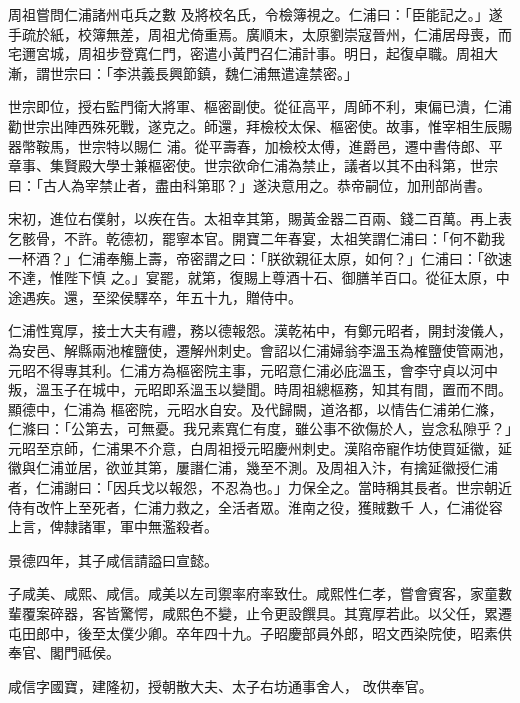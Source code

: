 \begin{pinyinscope}
 周祖嘗問仁浦諸州屯兵之數
 及將校名氏，令檢簿視之。仁浦曰：「臣能記之。」遂手疏於紙，校簿無差，周祖尤倚重焉。廣順末，太原劉崇寇晉州，仁浦居母喪，而宅邇宮城，周祖步登寬仁門，密遣小黃門召仁浦計事。明日，起復卓職。周祖大漸，謂世宗曰：「李洪義長興節鎮，魏仁浦無遣違禁密。」



 世宗即位，授右監門衛大將軍、樞密副使。從征高平，周師不利，東偏已潰，仁浦勸世宗出陣西殊死戰，遂克之。師還，拜檢校太保、樞密使。故事，惟宰相生辰賜器幣鞍馬，世宗特以賜仁
 浦。從平壽春，加檢校太傅，進爵邑，遷中書侍郎、平章事、集賢殿大學士兼樞密使。世宗欲命仁浦為禁止，議者以其不由科第，世宗曰：「古人為宰禁止者，盡由科第耶？」遂決意用之。恭帝嗣位，加刑部尚書。



 宋初，進位右僕射，以疾在告。太祖幸其第，賜黃金器二百兩、錢二百萬。再上表乞骸骨，不許。乾德初，罷寧本官。開寶二年春宴，太祖笑謂仁浦曰：「何不勸我一杯酒？」仁浦奉觴上壽，帝密謂之曰：「朕欲親征太原，如何？」仁浦曰：「欲速不達，惟陛下慎
 之。」宴罷，就第，復賜上尊酒十石、御膳羊百口。從征太原，中途遇疾。還，至梁侯驛卒，年五十九，贈侍中。



 仁浦性寬厚，接士大夫有禮，務以德報怨。漢乾祐中，有鄭元昭者，開封浚儀人，為安邑、解縣兩池榷鹽使，遷解州刺史。會詔以仁浦婦翁李溫玉為榷鹽使管兩池，元昭不得專其利。仁浦方為樞密院主事，元昭意仁浦必庇溫玉，會李守貞以河中叛，溫玉子在城中，元昭即系溫玉以變聞。時周祖總樞務，知其有間，置而不問。顯德中，仁浦為
 樞密院，元昭水自安。及代歸闕，道洛都，以情告仁浦弟仁滌，仁滌曰：「公第去，可無憂。我兄素寬仁有度，雖公事不欲傷於人，豈念私隙乎？」元昭至京師，仁浦果不介意，白周祖授元昭慶州刺史。漢陷帝寵作坊使買延徽，延徽與仁浦並居，欲並其第，屢譖仁浦，幾至不測。及周祖入汴，有擒延徽授仁浦者，仁浦謝曰：「因兵戈以報怨，不忍為也。」力保全之。當時稱其長者。世宗朝近侍有改忤上至死者，仁浦力救之，全活者眾。淮南之役，獲賊數千
 人，仁浦從容上言，俾隸諸軍，軍中無濫殺者。



 景德四年，其子咸信請謚曰宣懿。



 子咸美、咸熙、咸信。咸美以左司禦率府率致仕。咸熙性仁孝，嘗會賓客，家童數輩覆案碎器，客皆驚愕，咸熙色不變，止令更設饌具。其寬厚若此。以父任，累遷屯田郎中，後至太僕少卿。卒年四十九。子昭慶部員外郎，昭文西染院使，昭素供奉官、閣門祗侯。



 咸信字國寶，建隆初，授朝散大夫、太子右坊通事舍人，
 改供奉官。




\end{pinyinscope}
